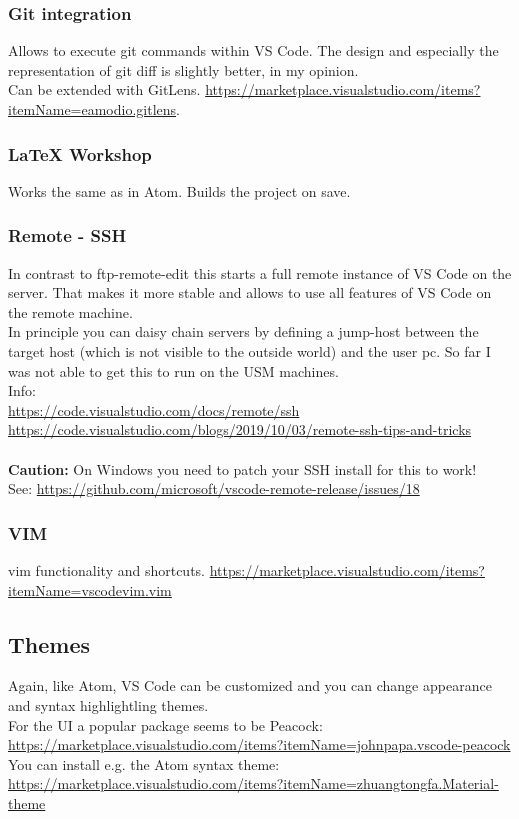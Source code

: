 \documentclass[10pt,a4paper]{article}
\begin{document}
\subsubsection{Git integration}
Allows to execute git commands within VS Code. The design and especially the representation of git diff is slightly better, in my opinion.\\
Can be extended with GitLens. \url{https://marketplace.visualstudio.com/items?itemName=eamodio.gitlens}.

\subsubsection{LaTeX Workshop}
Works the same as in Atom. Builds the project on save.

\subsubsection{Remote - SSH}
In contrast to ftp-remote-edit this starts a full remote instance of VS Code on the server. That makes it more stable and allows to use all features of VS Code on the remote machine.\\
In principle you can daisy chain servers by defining a jump-host between the target host (which is not visible to the outside world) and the user pc. So far I was not able to get this to run on the USM machines.\\
Info:\\
\url{https://code.visualstudio.com/docs/remote/ssh}\\
\url{https://code.visualstudio.com/blogs/2019/10/03/remote-ssh-tips-and-tricks}\\
\\
\textbf{Caution:} On Windows you need to patch your SSH install for this to work!\\
See: \url{https://github.com/microsoft/vscode-remote-release/issues/18}

\subsubsection{VIM}
vim functionality and shortcuts. \url{https://marketplace.visualstudio.com/items?itemName=vscodevim.vim}

\subsection{Themes}

Again, like Atom, VS Code can be customized and you can change appearance and syntax highlightling themes.\\
For the UI a popular package seems to be Peacock: \url{https://marketplace.visualstudio.com/items?itemName=johnpapa.vscode-peacock}\\
You can install e.g. the Atom syntax theme: \url{https://marketplace.visualstudio.com/items?itemName=zhuangtongfa.Material-theme}
\end{document}
